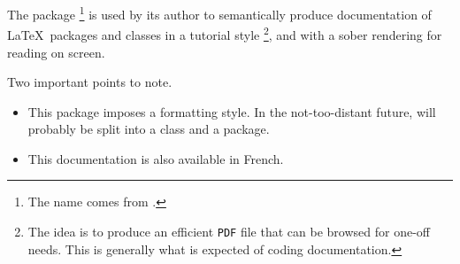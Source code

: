 \documentclass[10pt, a4paper]{article}
\begin{document}
The  package
\footnote{
    The name comes from .
}
is used by its author to semantically produce documentation of \LaTeX\ packages and classes in a tutorial style
\footnote{
    The idea is to produce an efficient \texttt{PDF} file that can be browsed for one-off needs. This is generally what is expected of coding documentation.
},
and with a sober rendering for reading on screen.

\medskip

Two important points to note.
\begin{itemize}
	\item This package imposes a formatting style. In the not-too-distant future,  will probably be split into a class and a package.

	\item This documentation is also available in French.
\end{itemize}
\end{document}
